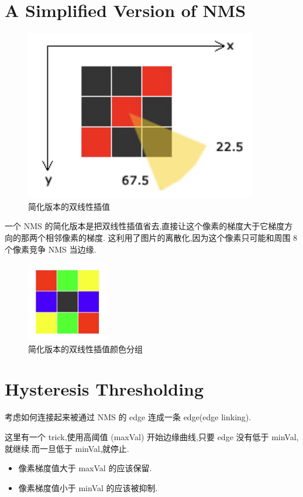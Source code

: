 \section{A Simplified Version of NMS}

\begin{figure}[htbp]
    \centering
	\includegraphics[scale=0.55]{figures/simple_NMS.png}
	\caption{简化版本的双线性插值}
\end{figure}

一个 NMS 的简化版本是把双线性插值省去,直接让这个像素的梯度大于它梯度方向的那两个相邻像素的梯度. 这利用了图片的离散化,因为这个像素只可能和周围 8 个像素竞争 NMS 当边缘.

\begin{figure}[htbp]
    \centering
	\includegraphics[scale=0.55]{figures/simple_NMS_2.png}
	\caption{简化版本的双线性插值颜色分组}
\end{figure}

\section{Hysteresis Thresholding}

考虑如何连接起来被通过 NMS 的 edge 连成一条 edge(edge linking).

这里有一个 trick,使用高阈值 (maxVal) 开始边缘曲线,只要 edge 没有低于 minVal,就继续.而一旦低于 minVal,就停止.

\begin{itemize}
    \item 像素梯度值大于 maxVal 的应该保留.
    \item 像素梯度值小于 minVal 的应该被抑制.
\end{itemize}

